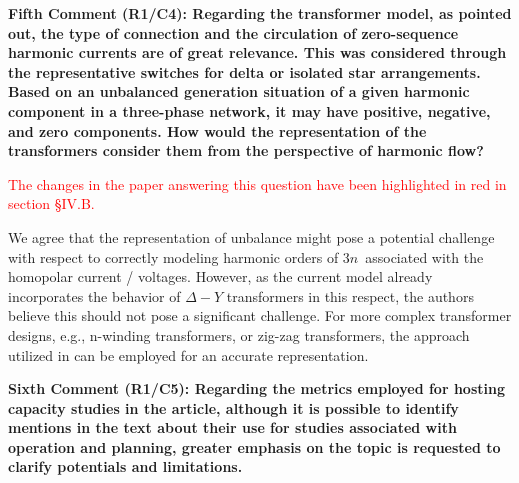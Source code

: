 \documentclass[10pt]{article}
\begin{document}
 
\textbf{Fifth Comment (R1/C4): Regarding the transformer model, as pointed out, the type of connection and the circulation of zero-sequence harmonic currents are of great relevance. This was considered through the representative switches for delta or isolated star arrangements. Based on an unbalanced generation situation of a given harmonic component in a three-phase network, it may have positive, negative, and zero components. How would the representation of the transformers consider them from the perspective of harmonic flow?}

\begin{tcolorbox}[colback=black!5!white,colframe=black]

\textcolor{red}{The changes in the paper answering this question have been highlighted in red in section \S IV.B.} \newline

We agree that the representation of unbalance might pose a potential challenge with respect to correctly modeling harmonic orders of $3n$~associated with the homopolar current / voltages. However, as the current model already incorporates the behavior of $\Delta - Y$ transformers in this respect, the authors believe this should not pose a significant challenge. For more complex transformer designs, e.g., n-winding transformers, or zig-zag transformers, the approach utilized in \cite{claeys_decomposition_2020} can be employed for an accurate representation.

\end{tcolorbox}

\textbf{Sixth Comment (R1/C5): Regarding the metrics employed for hosting capacity studies in the article, although it is possible to identify mentions in the text about their use for studies associated with operation and planning, greater emphasis on the topic is requested to clarify potentials and limitations.}
\end{document}
